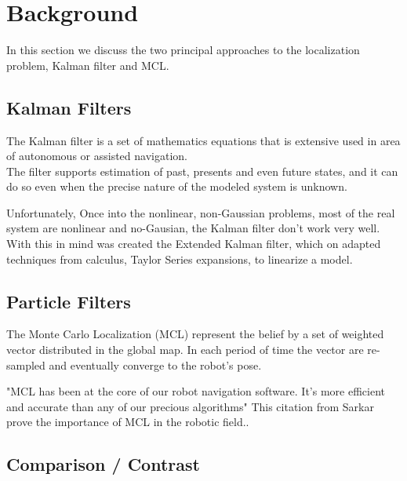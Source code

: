 \documentclass[10pt,journal,compsoc]{IEEEtran}
\begin{document}
\section{Background}

In this section we discuss the two principal approaches to the localization problem, Kalman filter and MCL.

\subsection{Kalman Filters}

The Kalman filter is a set of mathematics equations that is extensive used in area of autonomous or assisted
navigation.\\
The filter supports estimation of past, presents and even future states, and it can do so even when the precise nature
of the modeled system is unknown\cite{Welch1997}.

Unfortunately, Once into the nonlinear, non-Gaussian problems, most of the real system are nonlinear and no-Gausian, the
Kalman filter don't work very well. With this in mind was created the Extended Kalman filter, which on adapted
techniques from calculus, Taylor Series expansions, to linearize a model. 

\subsection{Particle Filters}

The Monte Carlo Localization (MCL) represent the belief by a set of weighted vector distributed in the global map. In
each period of time the vector are re-sampled and eventually converge to the robot's pose.


"MCL has been at the core of our robot navigation software. It's more efficient and accurate than any of our precious
algorithms" This citation from Sarkar prove the importance of MCL in the robotic field.\cite{Sarkar2009}.
\subsection{Comparison / Contrast}
\end{document}
